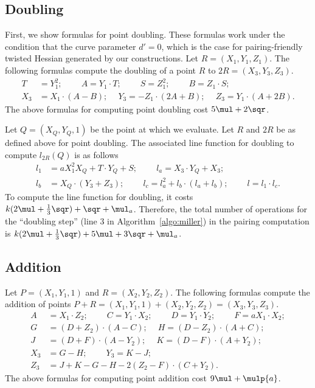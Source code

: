 \subsection{Doubling}
First, we show formulas for point doubling.
These formulas work under the condition that the curve parameter $d'=0$,
which is the case for pairing-friendly twisted Hessian generated by our constructions.
Let $R = (X_1, Y_1, Z_1)$.
The following formulas compute the doubling of a point $R$ to $2R = (X_3,Y_3,Z_3)$.
\begin{align*}
T &= Y_1^2;\	\qquad	A = Y_1 \cdot T;\	\qquad
S = Z_1 ^ 2;\	\qquad	B = Z_1 \cdot S;\\
X_3 &= X_1 \cdot (A - B);\	\quad
Y_3 = -Z_1 \cdot (2A + B);\	\quad
Z_3 = Y_1 \cdot (A + 2B).
\end{align*}
The above formulas for computing point doubling
cost $5\mul + 2\sqr$. %

Let $Q = (X_{Q}, Y_{Q}, 1)$ be the point at which we evaluate.
Let $R$ and $2R$ be as defined above for point doubling.
The associated line function for doubling
to compute $l_{2R}(Q)$ is as follows
\begin{align*}
l_1 &= a X_1^2 X_{Q} + T \cdot Y_{Q} + S;\		\qquad
l_a = X_3 \cdot Y_{Q} + X_3;			\\
l_b &= X_{Q} \cdot (Y_3 + Z_3);\			\qquad
l_c = l_a^2 + l_b \cdot (l_a + l_b);\		\qquad
l = l_1 \cdot l_c.
\end{align*}
To compute the line function for doubling,
it costs 
$k(2\mul + \frac{1}{3}\sqr) + \sqr + \mul_a$.
Therefore, the total number of operations for the ``doubling step''
({line 3} in Algorithm~\ref{algo:miller}) in the pairing computation is
$k(2\mul + \frac{1}{3}\sqr) + 5\mul +3\sqr + \mul_a$.


\subsection{Addition}
Let $P = (X_1,Y_1,1)$ and $R = (X_2,Y_2,Z_2)$.
The following formulas compute the addition of points
$P + R = (X_1,Y_1,1) + (X_2,Y_2,Z_2) = (X_3,Y_3,Z_3)$.
\begin{align*}
A &= X_1 \cdot Z_2;\	\qquad
C = Y_1 \cdot X_2;\	\qquad
D = Y_1 \cdot Y_2;\	\qquad
F = a X_1 \cdot X_2;\\
G &= (D + Z_2) \cdot (A - C);\	\quad
H = (D - Z_2) \cdot (A + C);\\
J &= (D + F) \cdot (A - Y_2);\	\quad
K = (D - F) \cdot (A + Y_2);\\
X_3 &= G - H;\	\qquad
Y_3 = K - J;\\
Z_3 &= J + K - G - H - 2(Z_2 - F) \cdot (C + Y_2).
\end{align*}
The above formulas for computing point addition
cost $9\mul + \mulp{a}$.

